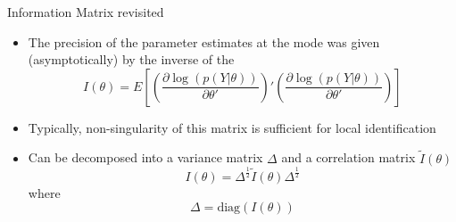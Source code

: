 \documentclass[handout,usepdftitle=false,xcolor=dvipsnames,aspectratio=169]{beamer}
\begin{document}
\renewcommand{\Source}{\textcite{Iskrev2011}}

\begin{frame}{Information Matrix revisited}
  \begin{itemize}
    \item The precision of the parameter estimates at the mode was given (asymptotically) by the inverse of the 
          \begin{equation}
            I\left( \theta  \right) = E\left[ {\left( {\frac{{\partial \log \left( {p\left( {Y|\theta } \right)} \right)}}{{\partial \theta '}}} \right)'\left( {\frac{{\partial \log \left( {p\left( {Y|\theta } \right)} \right)}}{{\partial \theta '}}} \right)} \right]
          \end{equation}
    \item Typically, non-singularity of this matrix is sufficient for local identification \parencite[for details see][]{Iskrev2011}
    \item Can be decomposed into a variance matrix $\Delta$ and a correlation matrix $\tilde I\left( \theta  \right)$
          \begin{equation}
            I\left( \theta  \right) = {\Delta ^{\frac{1}{2}}}\tilde I\left( \theta  \right){\Delta ^{\frac{1}{2}}} \label{eq:Fisher_decomposed}
          \end{equation}
          where
          \[
            \Delta  = \text{diag}\left( {I\left( \theta  \right)} \right)
          \]
  \end{itemize}
\end{frame}
\end{document}
